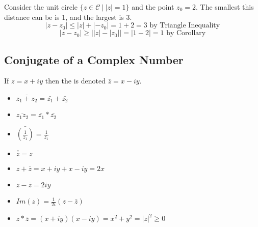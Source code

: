 \documentclass[12pt]{scrartcl}
\newcommand{\C}{\mathcal{C}}
\begin{document}
\begin{example}
  Consider the unit circle $\{z \in \C \ | \ |z| = 1\}$ and the point $z_0 = 2$. The smallest this distance can be is $1$, 
  and the largest is $3$.
  \[|z - z_0| \leq |z| + |-z_0| = 1 + 2 = 3 \text{ by Triangle Inequality}\]
  \[|z-z_0| \geq \left| |z| - |z_0| \right| = |1 - 2| = 1 \text{ by Corollary}\]
\end{example}

\subsection{Conjugate of a Complex Number}

\begin{definition}
    If $z = x + iy$ then the  is denoted $\bar{z} = x - iy$.
\end{definition}

\begin{note}
  
  \hfill

  \begin{itemize}
    \item $\overline{z_1 + z_2} = \bar{z_1} + \bar{z_2}$
    \item $\overline{z_1z_2} = \bar{z_1} * \bar{z_2}$
    \item $\bar{(\frac{1}{z_1})} = \frac{1}{\bar{z_1}}$
    \item $\overline{\bar{z}} = z$
  \end{itemize}

\end{note}

\begin{remark}
  
  \hfill

  \begin{itemize}
    \item $z + \overline{z} = x + iy + x - iy = 2x$
    \item $z - \overline{z} = 2iy$
    \item $Im(z) = \frac{1}{2i}(z - \bar{z})$
    \item $z * \bar{z} = (x + iy)(x - iy) = x^2 + y^2 = |z|^2 \geq 0$
  \end{itemize}

\end{remark}
\end{document}
